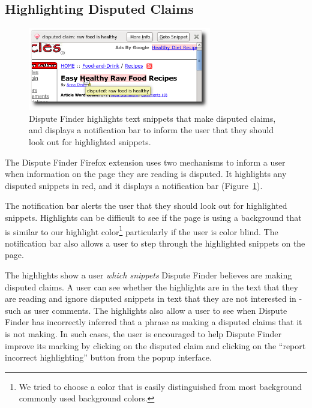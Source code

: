 \documentclass{www2010-submission}
\begin{document}
\subsection{Highlighting Disputed Claims}

\begin{figure}[tb]
	\begin{center}
	\includegraphics[width=8cm]{pictures/highlight_bar.png}
	\caption{Dispute Finder highlights text snippets that make disputed claims, and displays a notification bar to inform the user that they should look out for highlighted snippets.}
	\label{highlight_bar}
	\end{center}
\end{figure}

%
%

The Dispute Finder Firefox extension uses two mechanisms to inform a user when information on the page they are reading is disputed. It highlights any disputed snippets in red, and it displays a notification bar (Figure~\ref{highlight_bar}). 

The notification bar alerts the user that they should look out for highlighted snippets. Highlights can be difficult to see if the page is using a background that is similar to our highlight color\footnote{We tried to choose a color that is easily distinguished from most background commonly used background colors.} particularly if the user is color blind. The notification bar also allows a user to step through the highlighted snippets on the page.

The highlights show a user {\it which snippets} Dispute Finder believes are making disputed claims. A user can see whether the highlights are in the text that they are reading and ignore disputed snippets in text that they are not interested in - such as user comments. The highlights also allow a user to see when Dispute Finder has incorrectly inferred that a phrase as making a disputed claims that it is not making. In such cases, the user is encouraged to help Dispute Finder improve its marking by clicking on the disputed claim and clicking on the ``report incorrect highlighting'' button from the popup interface.
\end{document}
